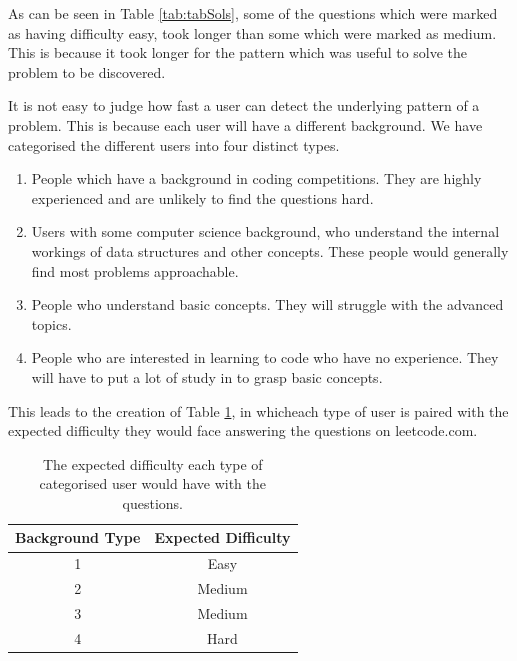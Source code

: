 \documentclass[10pt,twocolumn,hidelinks]{IEEEtran}
\begin{document}
\par As can be seen in Table \ref{tab:tabSols}, some of the questions which were marked as having difficulty easy, took longer than some which were marked as medium. This is because it took longer for the pattern which was useful to solve the problem to be discovered.
\par It is not easy to judge how fast a user can detect the underlying pattern of a problem. This is because each user will have a different background. We have categorised the different users into four distinct types. 
\begin{enumerate}
\item{People which have a background in coding competitions. They are highly experienced and are unlikely to find the questions hard.}
\item{Users with some computer science background, who understand the internal workings of data structures and other concepts. These people would generally find most problems approachable.}
\item{People who understand basic concepts. They will struggle with the advanced topics.}
\item{People who are interested in learning to code who have no experience. They will have to put a lot of study in to grasp basic concepts.}
\end{enumerate}
This leads to the creation of Table \ref{tab:difficulty}, in whicheach type of user is paired with the expected difficulty they would face answering the questions on leetcode.com. 
\begin{table}[t]
\centering
	\begin{tabular}{| c | c |} \hline
		   Background Type &Expected Difficulty \\ \hline
		1 & Easy \\ \hline
		2 & Medium \\ \hline
		3 & Medium  \\ \hline
		4 & Hard  \\ \hline
	\end{tabular}
	\caption{The expected difficulty each type of categorised user would have with the questions.}
	\label{tab:difficulty}
\end{table}
\end{document}
